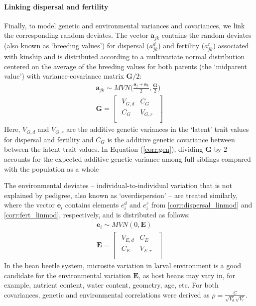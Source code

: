 \paragraph{Linking dispersal and fertility}
Finally, to model genetic and environmental variances and covariances, we link the corresponding random deviates. The vector $\bm{a}_{jk}$ contains the random deviates (also known as `breeding values') for dispersal ($a^{d}_{jk}$) and fertility ($a^{r}_{jk}$) associated with kinship and is distributed according to a multivariate normal distribution centered on the average of the breeding values for both parents (the `midparent value') with variance-covariance matrix $\bm{G}/2$:
%
\begin{gather} \label{corr:gen}
  \bm{a}_{jk} \sim \mathit{MVN} \Big( \frac{\bm{a}_{j} + \bm{a}_{k}}{2}, \frac{\bm{G}}{2} \Big) \\[10pt]
  \bm{G} =
  \begin{bmatrix}
    \begin{array}{ll}
      V_{G,d} &C_{G}   \\
      C_{G}   &V_{G,r} \\
    \end{array}
  \end{bmatrix}
\end{gather}
%
Here, $V_{G,d}$ and $V_{G,r}$ are the additive genetic variances in the `latent' trait values for dispersal and fertility and $C_{G}$ is the additive genetic covariance between between the latent trait values. In Equation (\ref{corr:gen}), dividing $\bm{G}$ by $2$ accounts for the expected additive genetic variance among full siblings compared with the population as a whole \citep{roughgarden_theory_1979} 

The environmental deviates -- individual-to-individual variation that is not explained by pedigree, also known as `overdispersion' \citep{de2016general} -- are treated similarly, where the vector $\bm{e}_{i}$ contains elements $e^{d}_{i}$ and $e^{r}_{i}$ from \ref{corr:dispersal_linmod} and \ref{corr:fert_linmod}, respectively, and is distributed as follows:
%
\begin{gather} \label{corr:env}
  \bm{e}_{i} \sim \mathit{MVN} (0, \bm{E}) \\[5pt]
  \bm{E} =
  \begin{bmatrix}
    \begin{array}{ll}
      V_{E,d} &C_{E}   \\
      C_{E}   &V_{E,r} \\
    \end{array}
  \end{bmatrix}
\end{gather}
%
In the bean beetle system, microsite variation in larval environment is a good candidate for the environmental variation $\bm{E}$, as host beans may vary in, for example, nutrient content, water content, geometry, age, etc. For both covariances, genetic and environmental correlations were derived as $\rho = \frac{C}{\sqrt{V_{d}}\sqrt{V_{r}}}$. 

